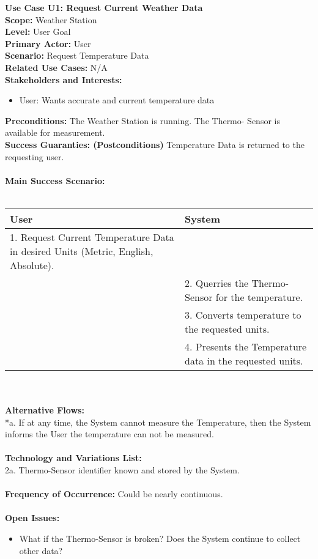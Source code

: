 \documentclass[letterpaper]{article}
\begin{document}
\noindent
\textbf{Use Case U1:  Request Current Weather Data}\\
\textbf{Scope:  }Weather Station\\
\textbf{Level:  }User Goal\\
\textbf{Primary Actor:  }User\\
\textbf{Scenario:  }Request Temperature Data\\
\textbf{Related Use Cases:  }N/A\\
\textbf{Stakeholders and Interests:}
\begin{itemize}
\item User:  Wants accurate and current temperature data
\end{itemize}
\textbf{Preconditions:  }The Weather Station is running. The Thermo-
Sensor is available for measurement.\\
\textbf{Success Guaranties:  (Postconditions)} 
Temperature Data is returned to the requesting user.\\\\
\textbf{Main Success Scenario: }\\\\
\begin{tabular}{|p{6cm}|p{6cm}|}\hline
\textbf{User} & \textbf{System}\\\hline
1.  Request Current Temperature Data in desired Units (Metric,
English, Absolute). 
& \\\hline
&2.  Querries the Thermo-Sensor for the temperature.\\\hline
&3.  Converts temperature to the requested units.\\\hline
&4.  Presents the Temperature data in the requested units.\\\hline
\end{tabular}\\\\
\textbf{Alternative Flows:  }\\
*a.  If at any time, the System cannot measure the Temperature, then
the System informs the User the temperature can not be measured.\\\\
\textbf{Technology and Variations List:  }\\
2a.  Thermo-Sensor identifier known and stored by the System.\\\\
\textbf{Frequency of Occurrence:  }Could be nearly continuous.\\\\
\textbf{Open Issues:  }\\
\begin{itemize}
\item What if the Thermo-Sensor is broken?  Does the System continue
to collect other data?
\end{itemize}
\end{document}
